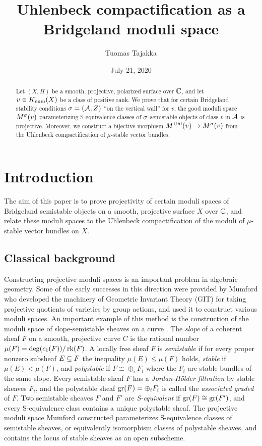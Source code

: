 \documentclass[letterpaper,12pt]{amsart}
\title{Uhlenbeck compactification as a Bridgeland moduli space}
\author{Tuomas Tajakka}
\date{July 21, 2020}
\theoremstyle{remark}
\begin{document}
\maketitle

\begin{abstract}
    Let $(X,H)$ be a smooth, projective, polarized surface over $\mathbb{C}$, and let $v \in K_{\mathrm{num}}(X)$ be a class of positive rank. We prove that for certain Bridgeland stability conditions $\sigma = (\mathcal{A}, Z)$ ``on the vertical wall'' for $v$, the good moduli space $M^\sigma(v)$ parameterizing S-equivalence classes of $\sigma$-semistable objects of class $v$ in $\mathcal{A}$ is projective. Moreover, we construct a bijective morphism $M^{\mathrm{Uhl}}(v) \to M^\sigma(v)$ from the Uhlenbeck compactification of $\mu$-stable vector bundles.
\end{abstract}

\tableofcontents


\section{Introduction}
The aim of this paper is to prove projectivity of certain moduli spaces of Bridgeland semistable objects on a smooth, projective surface $X$ over $\mathbb{C}$, and relate these moduli spaces to the Uhlenbeck compactification of the moduli of $\mu$-stable vector bundles on $X$.

\subsection*{Classical background}

Constructing projective moduli spaces is an important problem in algebraic geometry. Some of the early successes in this direction were provided by Mumford who developed the machinery of Geometric Invariant Theory (GIT) for taking projective quotients of varieties by group actions, and used it to construct various moduli spaces. An important example of this method is the construction of the moduli space of slope-semistable sheaves on a curve \cite{mumford}. The \textit{slope} of a coherent sheaf $F$ on a smooth, projective curve $C$ is the rational number $\mu(F) = \deg(c_1(F))/\operatorname{\mathrm{rk}}(F)$. A locally free sheaf $F$ is \textit{semistable} if for every proper nonzero subsheaf $E \subseteq F$ the inequality $\mu(E) \le \mu(F)$ holds, \textit{stable} if $\mu(E) < \mu(F)$, and \textit{polystable} if $F \cong \oplus_i F_i$ where the $F_i$ are stable bundles of the same slope. Every semistable sheaf $F$ has a \textit{Jordan-H\"older filtration} by stable sheaves $F_i$, and the polystable sheaf $\operatorname{\mathrm{gr}}(F) = \oplus_i F_i$ is called the \textit{associated graded} of $F$. Two semistable sheaves $F$ and $F'$ are \textit{S-equivalent} if $\operatorname{\mathrm{gr}}(F) \cong \operatorname{\mathrm{gr}}(F')$, and every S-equivalence class contains a unique polystable sheaf. The projective moduli space Mumford constructed parameterizes S-equivalence classes of semistable sheaves, or equivalently isomorphism classes of polystable sheaves, and contains the locus of stable sheaves as an open subscheme.
\end{document}
